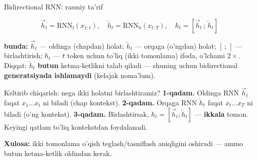 \documentclass[aspectratio=169,11pt]{beamer}
\newcommand{\bunda}[1]{{\small\textbf{bunda:}\; #1}}
\begin{document}
\begin{frame}{Bidirectional RNN: rasmiy ta'rif}
  \begin{tcolorbox}[defbox,title=Ta'rif: ikki tomonlama yashirin holat]
    \vspace{-0.4em}
    $$ \overrightarrow{h}_t = \mathrm{RNN}_{\text{f}}(x_{1:t}), \quad
       \overleftarrow{h}_t = \mathrm{RNN}_{\text{b}}(x_{t:T}), \quad
       h_t = [\overrightarrow{h}_t\,;\,\overleftarrow{h}_t] $$
  \end{tcolorbox}
  \vspace{2pt}
  \bunda{$\overrightarrow{h}_t$ --- oldinga (chapdan) holat; $\overleftarrow{h}_t$ ---
  orqaga (o'ngdan) holat; $[\,;\,]$ --- birlashtirish; $h_t$ --- $t$ token uchun
  to'liq (ikki tomonlama) ifoda, o'lchami $2\times$.}
  \vspace{4pt}
  \footnotesize Diqqat: $\overleftarrow{h}_t$ \textbf{butun} ketma-ketlikni talab qiladi
  --- shuning uchun bidirectional \textbf{generatsiyada ishlamaydi} (kelajak noma'lum).
\end{frame}

\begin{frame}{Keltirib chiqarish: nega ikki holatni birlashtiramiz?}
  \textbf{1-qadam.} Oldinga RNN $\overrightarrow{h}_t$ faqat $x_1\ldots x_t$ ni biladi
  (chap kontekst).
  \pause
  \textbf{2-qadam.} Orqaga RNN $\overleftarrow{h}_t$ faqat $x_t\ldots x_T$ ni biladi
  (o'ng kontekst).
  \pause
  \textbf{3-qadam.} Birlashtirsak, $h_t=[\overrightarrow{h}_t;\overleftarrow{h}_t]$ ---
  \textbf{ikkala} tomon. Keyingi qatlam to'liq kontekstdan foydalanadi.
  \begin{tcolorbox}[okbox,top=2pt,bottom=2pt]
    \small \textbf{Xulosa:} ikki tomonlama o'qish teglash/tasniflash aniqligini
    oshiradi --- ammo butun ketma-ketlik oldindan kerak.
  \end{tcolorbox}
\end{frame}
\end{document}
